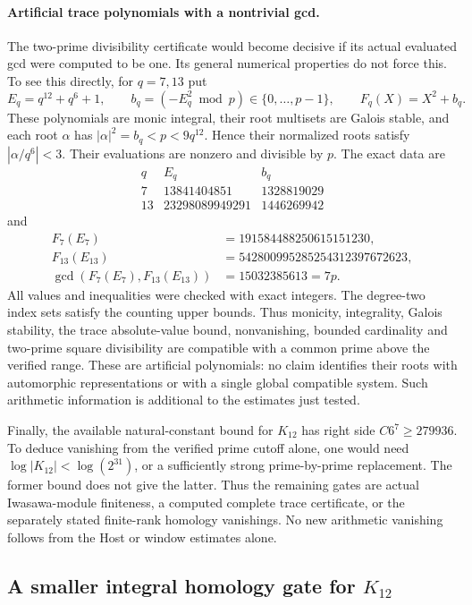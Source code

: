 \documentclass[11pt,a4paper]{article}
\theoremstyle{definition}
\begin{document}
\paragraph{Artificial trace polynomials with a nontrivial gcd.}
The two-prime divisibility certificate would become decisive if its
actual evaluated gcd were computed to be one.  Its general numerical
properties do not force this.  To see this directly, for $q=7,13$
put
\[
 E_q=q^{12}+q^6+1,\qquad
 b_q=(-E_q^2\bmod p)\in\{0,\ldots,p-1\},\qquad
 F_q(X)=X^2+b_q.
 \tag{HU.10}
\]
These polynomials are monic integral, their root multisets are
Galois stable, and each root $\alpha$ has
$|\alpha|^2=b_q<p<9q^{12}$.  Hence their normalized roots satisfy
$|\alpha/q^6|<3$.  Their evaluations are nonzero and divisible by
$p$.  The exact data are
\[
 \begin{array}{c|r|r}
 q&E_q&b_q\\ \hline
 7&13841404851&1328819029\\
 13&23298089949291&1446269942
 \end{array}
\]
and
\[
 \begin{split}
 F_7(E_7)&=191584488250615151230,\\
 F_{13}(E_{13})&=542800995285254312397672623,\\
 \gcd(F_7(E_7),F_{13}(E_{13}))
       &=15032385613=7p.
 \end{split}
 \tag{HU.11}
\]
All values and inequalities were checked with exact integers.
The degree-two index sets satisfy the counting upper bounds.
Thus monicity, integrality, Galois stability, the trace
absolute-value bound, nonvanishing, bounded cardinality and
two-prime square divisibility are compatible with a common prime
above the verified range.  These are artificial polynomials:
no claim identifies their roots with automorphic representations
or with a single global compatible system.  Such arithmetic
information is additional to the estimates just tested.

Finally, the available natural-constant bound for $K_{12}$ has
right side $C6^7\ge279936$.  To deduce vanishing from the
verified prime cutoff alone, one would need
$\log|K_{12}|<\log(2^{31})$, or a sufficiently strong
prime-by-prime replacement.  The former bound does not give the
latter.  Thus the remaining gates are actual Iwasawa-module
finiteness, a computed complete trace certificate, or the
separately stated finite-rank homology vanishings.  No new
arithmetic vanishing follows from the Host or window estimates
alone.

\subsection{A smaller integral homology gate for \texorpdfstring{$K_{12}$}{K12}}
\end{document}
